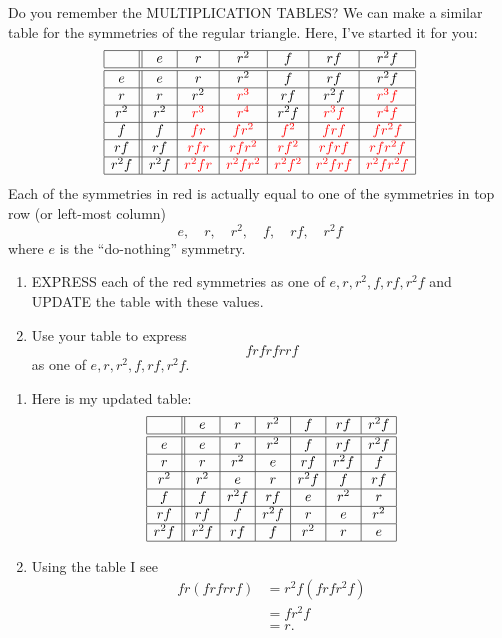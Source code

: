 \documentclass[noauthor,nooutcomes,hints,handout]{ximera}
\begin{document}
\begin{question}
  Do you remember the MULTIPLICATION TABLES? We can make a similar
  table for the symmetries of the regular triangle. Here, I've
  started it for you:
  \[
  \begin{array}{|c||c|c|c|c|c|c|}
    \hline
      & e & r & r^2 & f & rf & r^2f\\ \hline\hline
    e & e & r & r^2 & f & rf & r^2f\\ \hline
    r & r & r^2 & \color{red}r^3 & rf & r^2f & \color{red}r^3f\\ \hline
    r^2 & r^2 & \color{red}r^3 & \color{red}r^4 & r^2f & \color{red}r^3f &\color{red} r^4f\\ \hline
    f  & f & \color{red}fr & \color{red}fr^2 & \color{red}f^2 & \color{red}frf & \color{red}fr^2f\\ \hline
    rf & rf & \color{red}rfr & \color{red}rfr^2 & \color{red}rf^2 & \color{red}rfrf & \color{red}rfr^2f\\ \hline
    r^2f & r^2f & \color{red}r^2fr & \color{red}r^2fr^2 & \color{red}r^2f^2 &\color{red} r^2frf &\color{red} r^2fr^2f\\ \hline
  \end{array}
  \]
  Each of the symmetries in red is actually equal to one of the
  symmetries in top row (or left-most column)
  \[
  e,\quad r,\quad r^2,\quad f,\quad rf,\quad r^2f
  \]
  where $e$ is the ``do-nothing'' symmetry.
  \begin{enumerate}
    \item EXPRESS each of the red symmetries as one of
      $e,r,r^2,f,rf,r^2f$ and UPDATE the table with these values.
    \item Use your table to express
      \[
      frfrfrrf
      \]
      as one of $e,r,r^2,f,rf,r^2f$.
  \end{enumerate}
  \begin{freeResponse}
      \begin{enumerate}
      \item
      Here is my updated table:
       \[
  \begin{array}{|c||c|c|c|c|c|c|}
    \hline
    & e & r & r^2 & f & rf & r^2f\\ \hline\hline
    e & e & r & r^2 & f & rf & r^2f\\ \hline
    r & r & r^2 & e & rf & r^2f & f\\ \hline
    r^2 & r^2 & e & r & r^2f & f &rf\\ \hline
    f  & f & r^2f & rf & e & r^2 & r\\ \hline
    rf & rf & f & r^2f & r & e & r^2\\ \hline
    r^2f & r^2f & rf & f & r^2 & r & e\\ \hline
  \end{array}
  \]
\item Using the table I see
  \begin{align*}
    fr(frfrrf) &= r^2f(frfr^2f)\\
    &= fr^2f\\
    &=r.
  \end{align*}
    \end{enumerate}
  \end{freeResponse}
\end{question}
\end{document}
